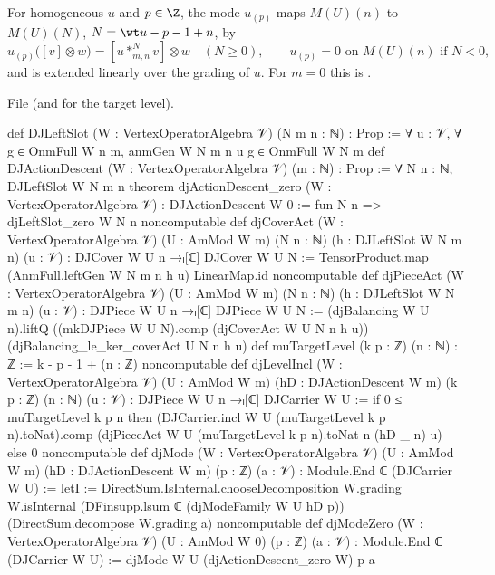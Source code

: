 \begin{definition}\label{l13:def:djmode}
For homogeneous $u$ and $p\in\Z$, the mode $u_{(p)}$ maps $M(U)(n)$ to $M(U)(N)$, $N = \wt u - p - 1 + n$, by
\begin{equation*}
 u_{(p)}\bigl([v]\otimes w\bigr) = [u*^N_{m,n}v]\otimes w\quad(N\ge0),\qquad u_{(p)} = 0\text{ on }M(U)(n)\text{ if }N<0,
\end{equation*}
and is extended linearly over the grading of $u$. For $m = 0$ this is .
\end{definition}
\noindent File  (and
 for the target level).
\begin{leancode}
def DJLeftSlot (W : VertexOperatorAlgebra 𝒱) (N m n : ℕ) : Prop :=
  ∀ u : 𝒱, ∀ g ∈ OnmFull W n m, anmGen W N m n u g ∈ OnmFull W N m
def DJActionDescent (W : VertexOperatorAlgebra 𝒱) (m : ℕ) : Prop :=
  ∀ N n : ℕ, DJLeftSlot W N m n
theorem djActionDescent_zero (W : VertexOperatorAlgebra 𝒱) : DJActionDescent W 0 :=
  fun N n => djLeftSlot_zero W N n
noncomputable def djCoverAct (W : VertexOperatorAlgebra 𝒱) (U : AmMod W m) (N n : ℕ)
    (h : DJLeftSlot W N m n) (u : 𝒱) : DJCover W U n →ₗ[ℂ] DJCover W U N :=
  TensorProduct.map (AnmFull.leftGen W N m n h u) LinearMap.id
noncomputable def djPieceAct (W : VertexOperatorAlgebra 𝒱) (U : AmMod W m) (N n : ℕ)
    (h : DJLeftSlot W N m n) (u : 𝒱) : DJPiece W U n →ₗ[ℂ] DJPiece W U N :=
  (djBalancing W U n).liftQ ((mkDJPiece W U N).comp (djCoverAct W U N n h u))
    (djBalancing_le_ker_coverAct U N n h u)
def muTargetLevel (k p : ℤ) (n : ℕ) : ℤ := k - p - 1 + (n : ℤ)
noncomputable def djLevelIncl (W : VertexOperatorAlgebra 𝒱) (U : AmMod W m)
    (hD : DJActionDescent W m) (k p : ℤ) (n : ℕ) (u : 𝒱) :
    DJPiece W U n →ₗ[ℂ] DJCarrier W U :=
  if 0 ≤ muTargetLevel k p n then
    (DJCarrier.incl W U (muTargetLevel k p n).toNat).comp
      (djPieceAct W U (muTargetLevel k p n).toNat n (hD _ n) u)
  else 0
noncomputable def djMode (W : VertexOperatorAlgebra 𝒱) (U : AmMod W m)
    (hD : DJActionDescent W m) (p : ℤ) (a : 𝒱) : Module.End ℂ (DJCarrier W U) :=
  letI := DirectSum.IsInternal.chooseDecomposition W.grading W.isInternal
  (DFinsupp.lsum ℂ (djModeFamily W U hD p)) (DirectSum.decompose W.grading a)
noncomputable def djModeZero (W : VertexOperatorAlgebra 𝒱) (U : AmMod W 0) (p : ℤ) (a : 𝒱) :
    Module.End ℂ (DJCarrier W U) :=
  djMode W U (djActionDescent_zero W) p a
\end{leancode}

